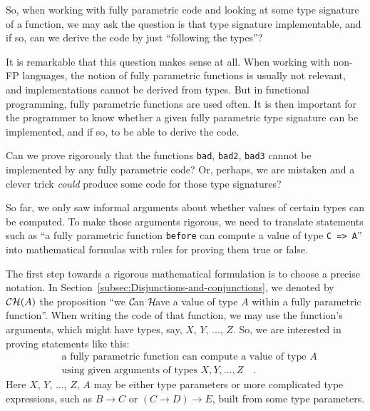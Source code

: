 So, when working with fully parametric code and looking at some type
signature of a function, we may ask the question \textemdash{} is
that type signature implementable, and if so, can we derive the code
by just \textsf{``}following the types\textsf{''}?

It is remarkable that this question makes sense at all. When working
with non-FP languages, the notion of fully parametric functions is
usually not relevant, and implementations cannot be derived from types.
But in functional programming, fully parametric functions are used
often. It is then important for the programmer to know whether a given
fully parametric type signature can be implemented, and if so, to
be able to derive the code.

Can we prove rigorously that the functions \lstinline!bad!, \lstinline!bad2!,
\lstinline!bad3! cannot be implemented by any fully parametric code?
Or, perhaps, we are mistaken and a clever trick \emph{could} produce
some code for those type signatures? 

So far, we only saw informal arguments about whether values of certain
types can be computed. To make those arguments rigorous, we need to
translate statements such as \textsf{``}a fully parametric function \lstinline!before!
can compute a value of type \lstinline!C => A!\textsf{''} into mathematical
formulas with rules for proving them true or false.

The first step towards a rigorous mathematical formulation is to choose
a precise notation. In Section~\ref{subsec:Disjunctions-and-conjunctions},
we denoted by ${\cal CH}(A)$ the proposition \textsf{``}we ${\cal C}\!$an
${\cal H}\!$ave a value of type $A$ within a fully parametric function\textsf{''}.
When writing the code of that function, we may use the function\textsf{'}s
arguments, which might have types, say, $X$, $Y$, ..., $Z$. So,
we are interested in proving statements like this:
\begin{align}
 & \text{a fully parametric function can compute a value of type }A\nonumber \\
 & \text{using given arguments of types }X,Y,...,Z\quad.\label{eq:ch-CH-proposition-def}
\end{align}
Here $X$, $Y$, ..., $Z$, $A$ may be either type parameters or
more complicated type expressions, such as $B\rightarrow C$ or $(C\rightarrow D)\rightarrow E$,
built from some type parameters.

